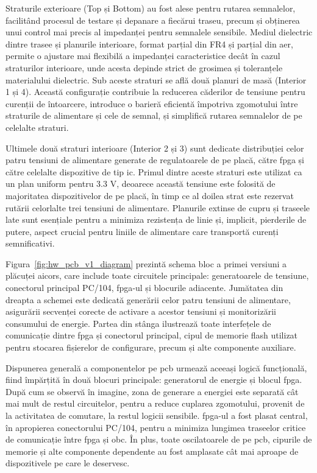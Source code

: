\documentclass[12pt,a4paper]{report}
\begin{document}
Straturile exterioare (Top și Bottom) au fost alese pentru rutarea semnalelor, facilitând procesul de testare și depanare a fiecărui traseu, precum și obținerea unui control mai precis al impedanței pentru semnalele sensibile. Mediul dielectric dintre trasee și planurile interioare, format parțial din FR4 și parțial din aer, permite o ajustare mai flexibilă a impedanței caracteristice decât în cazul straturilor interioare, unde acesta depinde strict de grosimea și toleranțele materialului dielectric. Sub aceste straturi se află două planuri de masă (Interior 1 și 4). Această configurație contribuie la reducerea căderilor de tensiune pentru curenții de întoarcere, introduce o barieră eficientă împotriva zgomotului între straturile de alimentare și cele de semnal, și simplifică rutarea semnalelor de pe celelalte straturi.

Ultimele două straturi interioare (Interior 2 și 3) sunt dedicate distribuției celor patru tensiuni de alimentare generate de regulatoarele de pe placă, către \gls{fpga} și către celelalte dispozitive de tip \gls{ic}. Primul dintre aceste straturi este utilizat ca un plan uniform pentru 3.3 V, deoarece această tensiune este folosită de majoritatea dispozitivelor de pe placă, în timp ce al doilea strat este rezervat rutării celorlalte trei tensiuni de alimentare. Planurile extinse de cupru și traseele late sunt esențiale pentru a minimiza rezistența de linie și, implicit, pierderile de putere, aspect crucial pentru liniile de alimentare care transportă curenți semnificativi.

Figura~\ref{fig:hw_pcb_v1_diagram} prezintă schema bloc a primei versiuni a plăcuței \gls{aicors}, care include toate circuitele principale: generatoarele de tensiune, conectorul principal PC/104, \gls{fpga}-ul și blocurile adiacente. Jumătatea din dreapta a schemei este dedicată generării celor patru tensiuni de alimentare, asigurării secvenței corecte de activare a acestor tensiuni și monitorizării consumului de energie. Partea din stânga ilustrează toate interfețele de comunicație dintre \gls{fpga} și conectorul principal, cipul de memorie flash utilizat pentru stocarea fișierelor de configurare, precum și alte componente auxiliare.

Dispunerea generală a componentelor pe \gls{pcb} urmează aceeași logică funcțională, fiind împărțită în două blocuri principale: generatorul de energie și blocul \gls{fpga}. După cum se observă în imagine, zona de generare a energiei este separată cât mai mult de restul circuitelor, pentru a reduce cuplarea zgomotului, provenit de la activitatea de comutare, la restul logicii sensibile. \gls{fpga}-ul a fost plasat central, în apropierea conectorului PC/104, pentru a minimiza lungimea traseelor critice de comunicație între \gls{fpga} și \gls{obc}. În plus, toate oscilatoarele de pe \gls{pcb}, cipurile de memorie și alte componente dependente au fost amplasate cât mai aproape de dispozitivele pe care le deservesc.
\end{document}
